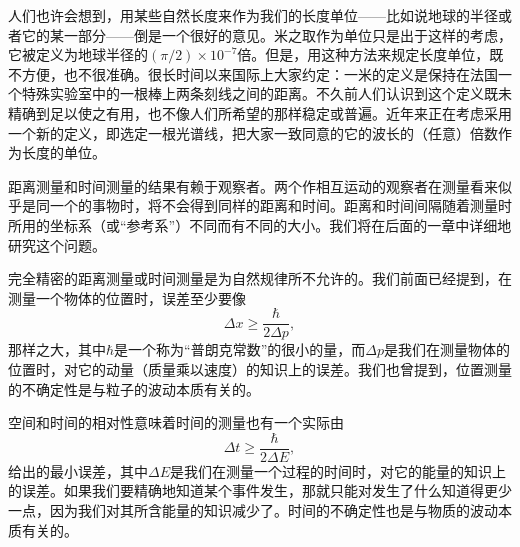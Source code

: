 人们也许会想到，用某些自然长度来作为我们的长度单位——比如说地球的半径或者它的某一部分——倒是一个很好的意见。米之取作为单位只是出于这样的考虑，它被定义为地球半径的$(\pi/2)\times10^{-7}$倍。但是，用这种方法来规定长度单位，既不方便，也不很准确。很长时间以来国际上大家约定：一米的定义是保持在法国一个特殊实验室中的一根棒上两条刻线之间的距离。不久前人们认识到这个定义既未精确到足以使之有用，也不像人们所希望的那样稳定或普遍。近年来正在考虑采用一个新的定义，即选定一根光谱线，把大家一致同意的它的波长的（任意）倍数作为长度的单位。

距离测量和时间测量的结果有赖于观察者。两个作相互运动的观察者在测量看来似乎是同一个的事物时，将不会得到同样的距离和时间。距离和时间间隔随着测量时所用的坐标系（或“参考系”）不同而有不同的大小。我们将在后面的一章中详细地研究这个问题。

完全精密的距离测量或时间测量是为自然规律所不允许的。我们前面已经提到，在测量一个物体的位置时，误差至少要像
\begin{equation*}
\Delta x\geq\frac{\hbar}{2\Delta p},
\end{equation*}
那样之大，其中$\hbar$是一个称为“普朗克常数”的很小的量，而$\Delta p$是我们在测量物体的位置时，对它的动量（质量乘以速度）的知识上的误差。我们也曾提到，位置测量的不确定性是与粒子的波动本质有关的。

空间和时间的相对性意味着时间的测量也有一个实际由
\begin{equation*}
\Delta t\geq\frac{\hbar}{2\Delta E},
\end{equation*}
给出的最小误差，其中$\Delta E$是我们在测量一个过程的时间时，对它的能量的知识上的误差。如果我们要精确地知道某个事件发生，那就只能对发生了什么知道得更少一点，因为我们对其所含能量的知识减少了。时间的不确定性也是与物质的波动本质有关的。
